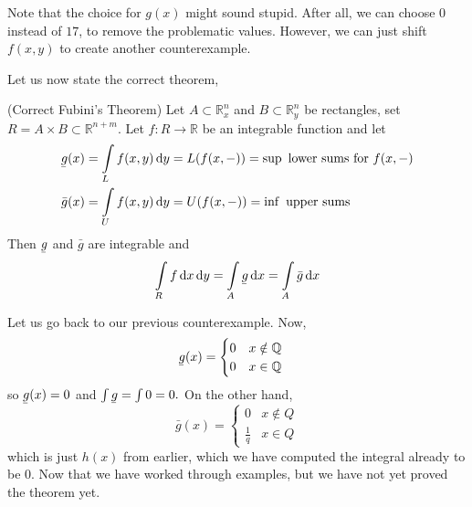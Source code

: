\documentclass{article}
\newcommand{\ubar}[1]{\underaccent{\bar}{#1}}
\numberwithin{equation}{section}
\begin{document}
Note that the choice for $g(x)$ might sound stupid. After all, we can choose $0$ instead of $17$, to remove the problematic values. However, we can just shift $f(x,y)$ to create another counterexample.

Let us now state the correct theorem,
\begin{theorem}
    (Correct Fubini's Theorem) Let $A \subset \mathbb{R}_x^n$ and $B \subset \mathbb{R}_y^n$ be rectangles, set $R=A\times B \subset \mathbb{R}^{n+m}$. Let $f:R\rightarrow \mathbb{R}$ be an integrable function and let
    \begin{align}
        \ubar{g}(x) & = \int\limits_L f(x,y) \dd{y} = L(f(x,-)) = \sup \text{ lower sums for } f(x,-) \\
        \bar{g}(x)  & = \int\limits_U f(x,y) \dd{y} = U(f(x,-)) = \inf \text{ upper sums}
    \end{align}
    Then $\ubar{g}$ and $\bar{g}$ are integrable and
    \begin{equation}
        \int\limits_R f\dd{x}\dd{y} = \int\limits_A \ubar{g} \dd{x} = \int\limits_A \bar{g} \dd{x}
    \end{equation}
\end{theorem}
Let us go back to our previous counterexample. Now,
\begin{align}
    \ubar{g}(x) & = \begin{cases}
        0 & x\notin \mathbb{Q} \\
        0 & x\in \mathbb{Q}
    \end{cases}
\end{align}
so $\ubar{g}(x)=0$ and $\int \ubar{g} = \int 0 = 0.$ On the other hand,
\begin{equation}
    \bar{g}(x) = \begin{cases}
        0           & x\not\in Q \\
        \frac{1}{q} & x \in Q
    \end{cases}
\end{equation}
which is just $h(x)$ from earlier, which we have computed the integral already to be $0$. Now that we have worked through examples, but we have not yet proved the theorem yet.
\end{document}
